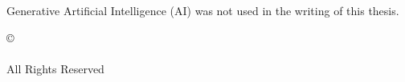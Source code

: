 
\thispagestyle{plain}
\doublespacing
\raggedright

Generative Artificial Intelligence (AI) was not used in the writing of this thesis.

\ifdefined\copyrightreg
\vspace*{\fill}
\begin{center}
\copyright \\
\studentname \\
All Rights Reserved
\end{center}
\else
\vspace*{\fill}
\fi

\newpage
\singlespacing
